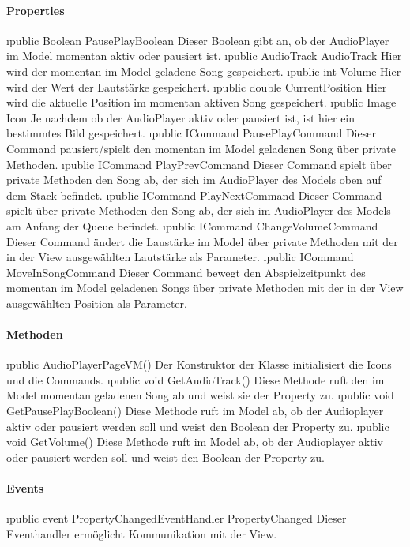 \documentclass[../entwurf.tex]{subfiles}
\begin{document}
\paragraph{Properties}
\begin{itemize}
	\i{public Boolean PausePlayBoolean} Dieser Boolean gibt an, ob der AudioPlayer im Model momentan aktiv oder pausiert ist.
	\i{public AudioTrack AudioTrack} Hier wird der momentan im Model geladene Song gespeichert.
	\i{public int Volume} Hier wird der Wert der Lautstärke gespeichert.
	\i{public double CurrentPosition} Hier wird die aktuelle Position im momentan aktiven Song gespeichert.
	\i{public Image Icon} Je nachdem ob der AudioPlayer aktiv oder pausiert ist, ist hier ein bestimmtes Bild gespeichert.
	\i{public ICommand PausePlayCommand} Dieser Command pausiert/spielt den momentan im Model geladenen Song über private Methoden. 
	\i{public ICommand PlayPrevCommand} Dieser Command spielt über private Methoden den Song ab, der sich im AudioPlayer des Models oben auf dem Stack befindet. 
	\i{public ICommand PlayNextCommand} Dieser Command spielt über private Methoden den Song ab, der sich im AudioPlayer des Models am Anfang der Queue befindet. 
	\i{public ICommand ChangeVolumeCommand} Dieser Command ändert die Laustärke im Model über private Methoden mit der in der View ausgewählten Lautstärke als Parameter.
	\i{public ICommand MoveInSongCommand} Dieser Command bewegt den Abspielzeitpunkt des momentan im Model geladenen Songs über private Methoden mit der in der View ausgewählten Position als Parameter.
\end{itemize}
\paragraph{Methoden}
\begin{itemize}
	\i{public AudioPlayerPageVM()} Der Konstruktor der Klasse initialisiert die Icons und die Commands.
	\i{public void GetAudioTrack()} Diese Methode ruft den im Model momentan geladenen Song ab und weist sie der Property  zu.
	\i{public void GetPausePlayBoolean()} Diese Methode ruft im Model ab, ob der Audioplayer aktiv oder pausiert werden soll und weist den Boolean der Property  zu.
	\i{public void GetVolume()} Diese Methode ruft im Model ab, ob der Audioplayer aktiv oder pausiert werden soll und weist den Boolean der Property  zu.
\end{itemize}
\paragraph{Events}
\begin{itemize}
	\i{public event PropertyChangedEventHandler PropertyChanged} Dieser Eventhandler ermöglicht Kommunikation mit der View.
\end{itemize}
\end{document}
